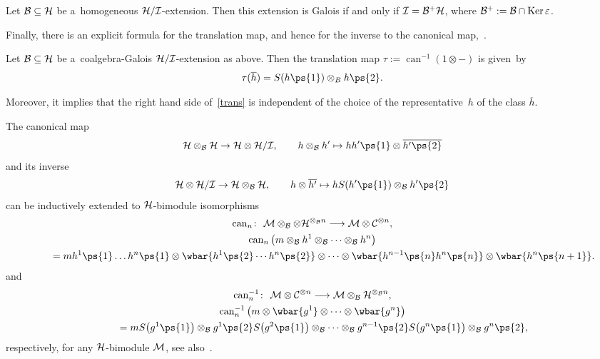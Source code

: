 \begin{Theorem}
Let ${\cal B}\subseteq {\cal H}$ be a~homogeneous ${\cal H}/{\cal I}$-extension.
Then this extension is Galois if and only if ${\cal I} ={\cal B}^{+}{\cal H}$, where ${\cal B}^{+}:={\cal B} \cap \operatorname{Ker}
\varepsilon$.
\end{Theorem}

Finally, there is an explicit formula for the translation map, and hence for the inverse to the canonical map,~\cite[Corollary~2.8]{BrzeHaja09}.

\begin{Corollary}
Let ${\cal B}\subseteq {\cal H}$ be a~coalgebra-Galois ${\cal H}/{\cal I}$-extension as above.
Then the translation map $\tau:=\operatorname{can}^{-1}(1 \otimes -)$ is given~by
\begin{gather}
\label{trans}
\tau(\overline{h}) =S(h\ps{1}) \otimes_{B} h\ps{2}.
\end{gather}
\end{Corollary}

Moreover, it implies that the right hand side of~\eqref{trans} is independent of the choice of the representative~$h$ of
the class $\overline{h}$.

The canonical map
\begin{gather*}%
{\cal H}\otimes_{{\cal B}}{\cal H}\rightarrow {\cal H}\otimes{\cal H}/{\cal I},
\qquad
h\otimes_{{\cal B}}h' \mapsto hh'\ps{1}\otimes \overline{h'\ps{2}}
\end{gather*}
and its inverse
\begin{gather*}%
{\cal H}\otimes{\cal H}/{\cal I} \rightarrow {\cal H}\otimes_{{\cal B}}{\cal H},
\qquad
h\otimes \overline{h'}\mapsto h S(h'\ps{1})\otimes_{{\cal B}} h'\ps{2}
\end{gather*}
can be inductively extended to ${\cal H}$-bimodule isomorphisms
\begin{gather*}%
\operatorname{can}_n\colon \ {\cal M}\otimes_{\cal B}\otimes{\cal H}^{\otimes_{\cal B} n} \longrightarrow {\cal M} \otimes {\cal C}^{\otimes n},
\\
\operatorname{can}_n\big(m \otimes_{\cal B} h^1\otimes_{\cal B} \cdots \otimes_{\cal B} h^n\big)
\\
\qquad{}
=mh^1\ps{1}\dots h^n\ps{1} \otimes \wbar{h^1\ps{2}\cdots h^n\ps{2}} \otimes\cdots\otimes \wbar{h^{n-1}\ps{n}h^n\ps{n}}
\otimes \wbar{h^n\ps{n+1}}.
\end{gather*}
and
\begin{gather*}%
\operatorname{can}^{-1}_n\colon \  {\cal M} \otimes {\cal C}^{\otimes n} \longrightarrow {\cal M}\otimes_{\cal B} {\cal H}^{\otimes_{\cal B} n},
\\
\operatorname{can}^{-1}_n\big(m \otimes \wbar{g^1} \otimes\cdots\otimes \wbar{g^n}\big)
\\
\qquad{}
=mS\big(g^1\ps{1}\big) \otimes_{\cal B} g^1\ps{2}S\big(g^2\ps{1}\big) \otimes_{\cal B} \cdots \otimes_{\cal B} g^{n-1}\ps{2}S\big(g^n\ps{1}\big)
\otimes_{\cal B} g^n\ps{2},
\end{gather*}
respectively, for any ${\cal H}$-bimodule ${\cal M}$, see also~\cite[Proposition~3.6]{Kadi14}.

